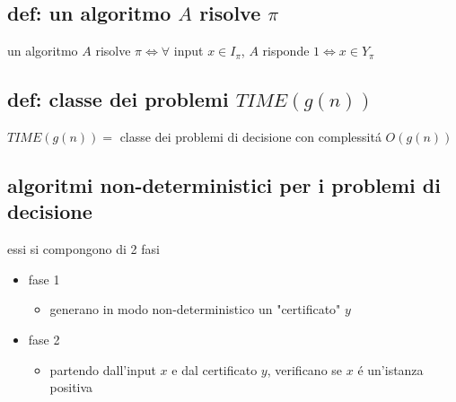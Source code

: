 
\subsection*{def: un algoritmo $A$ risolve $\pi$}
\begin{flushleft}
	un algoritmo $A$ risolve $\pi\iff\forall$ input $x\in I_{\pi}$, $A$ risponde $1\iff x\in Y_{\pi}$
\end{flushleft}


\subsection*{def: classe dei problemi $TIME(g(n))$}
\begin{flushleft}
	$TIME(g(n))=$ classe dei problemi di decisione con complessit\'a $O(g(n))$
\end{flushleft}


\subsection*{algoritmi non-deterministici per i problemi di decisione}
\begin{flushleft}
	essi si compongono di 2 fasi
	\begin{itemize}
		\item fase 1
		\begin{itemize}
			\item generano in modo non-deterministico un "certificato" $y$
		\end{itemize}
		\item fase 2
		\begin{itemize}
			\item partendo dall'input $x$ e dal certificato $y$, verificano se $x$ \'e un'istanza positiva
		\end{itemize}
	\end{itemize}
\end{flushleft}

